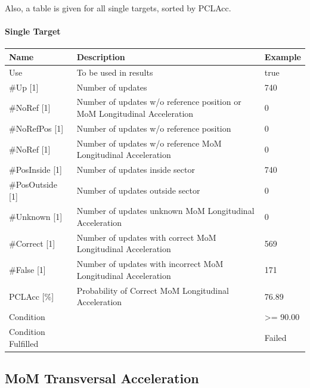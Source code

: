 Also, a table is given for all single targets, sorted by PCLAcc.

\paragraph{Single Target}

\begin{center}
 \begin{table}[H]
  \begin{tabularx}{\textwidth}{ | l | X |  l | }
    \hline
    \textbf{Name} & \textbf{Description} & \textbf{Example} \\ \hline
    Use & To be used in results & true \\ \hline
    \#Up [1] & Number of updates & 740 \\ \hline
    \#NoRef [1] & Number of updates w/o reference position or MoM Longitudinal Acceleration & 0 \\ \hline
    \#NoRefPos [1] & Number of updates w/o reference position  & 0 \\ \hline
    \#NoRef [1] & Number of updates w/o reference MoM Longitudinal Acceleration & 0 \\ \hline
    \#PosInside [1] & Number of updates inside sector & 740 \\ \hline
    \#PosOutside [1] & Number of updates outside sector & 0 \\ \hline
    \#Unknown [1] & Number of updates unknown MoM Longitudinal Acceleration & 0 \\ \hline
    \#Correct [1] & Number of updates with correct MoM Longitudinal Acceleration & 569 \\ \hline
    \#False [1] & Number of updates with incorrect MoM Longitudinal Acceleration & 171 \\ \hline
    PCLAcc [\%] & Probability of Correct MoM Longitudinal Acceleration & 76.89 \\ \hline
    Condition &  & >= 90.00 \\ \hline
    Condition Fulfilled &  & Failed \\ \hline
\end{tabularx}
\end{table}
\end{center}


\subsection{MoM Transversal Acceleration}
\label{sec:eval_req_mom_trans}


